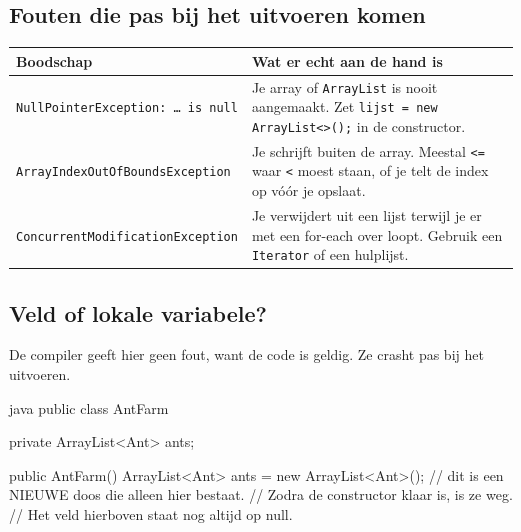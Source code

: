 \documentclass[a4paper,11pt]{article}
\begin{document}
\subsection{Fouten die pas bij het uitvoeren komen}

\begin{center}
    \begin{tabular}{@{}p{5.2cm}p{9.2cm}@{}}
        \toprule
        \textbf{Boodschap}                            & \textbf{Wat er echt aan de hand is} \\
        \midrule
        \texttt{NullPointerException: \dots\ is null} &
        Je array of \texttt{ArrayList} is nooit aangemaakt. Zet
        \texttt{lijst = new ArrayList<>();} in de constructor.                              \\
        \addlinespace
        \texttt{ArrayIndexOutOfBounds\-Exception}     &
        Je schrijft buiten de array. Meestal \texttt{<=} waar \texttt{<} moest staan, of
        je telt de index op v\'o\'or je opslaat.                                            \\
        \addlinespace
        \texttt{ConcurrentModification\-Exception}    &
        Je verwijdert uit een lijst terwijl je er met een for-each over loopt. Gebruik
        een \texttt{Iterator} of een hulplijst.                                             \\
        \bottomrule
    \end{tabular}
\end{center}

\subsection{Veld of lokale variabele?}

De compiler geeft hier geen fout, want de code is geldig. Ze crasht pas bij
het uitvoeren.

\begin{codeblock}{java}
    public class AntFarm
        {
            private ArrayList<Ant> ants;

            public AntFarm()
            {
                    ArrayList<Ant> ants = new ArrayList<Ant>();
                    // dit is een NIEUWE doos die alleen hier bestaat.
                    // Zodra de constructor klaar is, is ze weg.
                    // Het veld hierboven staat nog altijd op null.
                }
        }
\end{codeblock}
\end{document}
